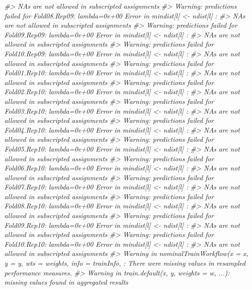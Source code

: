 \documentclass[]{book}
\newenvironment{Shaded}{\begin{snugshade}}{\end{snugshade}}
\newcommand{\CommentTok}[1]{\textcolor[rgb]{0.56,0.35,0.01}{\textit{#1}}}
\begin{document}
\begin{Shaded}
\begin{Highlighting}[]
\CommentTok{#>   NAs are not allowed in subscripted assignments}
\CommentTok{#> Warning: predictions failed for Fold08.Rep09: lambda=0e+00 Error in mindist[l] <- ndist[l] : }
\CommentTok{#>   NAs are not allowed in subscripted assignments}
\CommentTok{#> Warning: predictions failed for Fold09.Rep09: lambda=0e+00 Error in mindist[l] <- ndist[l] : }
\CommentTok{#>   NAs are not allowed in subscripted assignments}
\CommentTok{#> Warning: predictions failed for Fold10.Rep09: lambda=0e+00 Error in mindist[l] <- ndist[l] : }
\CommentTok{#>   NAs are not allowed in subscripted assignments}
\CommentTok{#> Warning: predictions failed for Fold01.Rep10: lambda=0e+00 Error in mindist[l] <- ndist[l] : }
\CommentTok{#>   NAs are not allowed in subscripted assignments}
\CommentTok{#> Warning: predictions failed for Fold02.Rep10: lambda=0e+00 Error in mindist[l] <- ndist[l] : }
\CommentTok{#>   NAs are not allowed in subscripted assignments}
\CommentTok{#> Warning: predictions failed for Fold03.Rep10: lambda=0e+00 Error in mindist[l] <- ndist[l] : }
\CommentTok{#>   NAs are not allowed in subscripted assignments}
\CommentTok{#> Warning: predictions failed for Fold04.Rep10: lambda=0e+00 Error in mindist[l] <- ndist[l] : }
\CommentTok{#>   NAs are not allowed in subscripted assignments}
\CommentTok{#> Warning: predictions failed for Fold05.Rep10: lambda=0e+00 Error in mindist[l] <- ndist[l] : }
\CommentTok{#>   NAs are not allowed in subscripted assignments}
\CommentTok{#> Warning: predictions failed for Fold06.Rep10: lambda=0e+00 Error in mindist[l] <- ndist[l] : }
\CommentTok{#>   NAs are not allowed in subscripted assignments}
\CommentTok{#> Warning: predictions failed for Fold07.Rep10: lambda=0e+00 Error in mindist[l] <- ndist[l] : }
\CommentTok{#>   NAs are not allowed in subscripted assignments}
\CommentTok{#> Warning: predictions failed for Fold08.Rep10: lambda=0e+00 Error in mindist[l] <- ndist[l] : }
\CommentTok{#>   NAs are not allowed in subscripted assignments}
\CommentTok{#> Warning: predictions failed for Fold09.Rep10: lambda=0e+00 Error in mindist[l] <- ndist[l] : }
\CommentTok{#>   NAs are not allowed in subscripted assignments}
\CommentTok{#> Warning: predictions failed for Fold10.Rep10: lambda=0e+00 Error in mindist[l] <- ndist[l] : }
\CommentTok{#>   NAs are not allowed in subscripted assignments}
\CommentTok{#> Warning in nominalTrainWorkflow(x = x, y = y, wts = weights, info = trainInfo, : There were missing values in resampled performance measures.}
\CommentTok{#> Warning in train.default(x, y, weights = w, ...): missing values found in aggregated results}

\end{Highlighting}
\end{Shaded}
\end{document}

